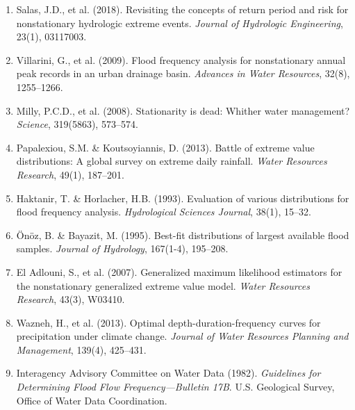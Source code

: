 \documentclass[a4paper, 11pt]{article}
\begin{document}
\begin{enumerate}
\item Salas, J.D., et al. (2018). Revisiting the concepts of return period and risk for
nonstationary hydrologic extreme events. \textit{Journal of Hydrologic Engineering}, 23(1),
03117003.

\item Villarini, G., et al. (2009). Flood frequency analysis for nonstationary annual peak
records in an urban drainage basin. \textit{Advances in Water Resources}, 32(8), 1255--1266.

\item Milly, P.C.D., et al. (2008). Stationarity is dead: Whither water management?
\textit{Science}, 319(5863), 573--574.

\item Papalexiou, S.M. \& Koutsoyiannis, D. (2013). Battle of extreme value distributions:
A global survey on extreme daily rainfall. \textit{Water Resources Research}, 49(1), 187--201.

\item Haktanir, T. \& Horlacher, H.B. (1993). Evaluation of various distributions for flood
frequency analysis. \textit{Hydrological Sciences Journal}, 38(1), 15--32.

\item Önöz, B. \& Bayazit, M. (1995). Best-fit distributions of largest available flood samples.
\textit{Journal of Hydrology}, 167(1-4), 195--208.

\item El Adlouni, S., et al. (2007). Generalized maximum likelihood estimators for the
nonstationary generalized extreme value model. \textit{Water Resources Research}, 43(3), W03410.

\item Wazneh, H., et al. (2013). Optimal depth-duration-frequency curves for precipitation under
climate change. \textit{Journal of Water Resources Planning and Management}, 139(4), 425--431.

\item Interagency Advisory Committee on Water Data (1982). \textit{Guidelines for Determining
Flood Flow Frequency—Bulletin 17B}. U.S. Geological Survey, Office of Water Data Coordination.
\end{enumerate}
\end{document}
